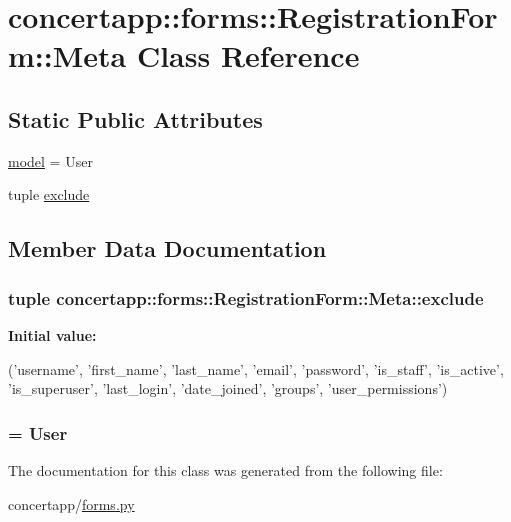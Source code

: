 \hypertarget{classconcertapp_1_1forms_1_1_registration_form_1_1_meta}{
\section{concertapp::forms::RegistrationForm::Meta Class Reference}
\label{classconcertapp_1_1forms_1_1_registration_form_1_1_meta}
}
\subsection*{Static Public Attributes}
\begin{DoxyCompactItemize}
\item 
\hyperlink{classconcertapp_1_1forms_1_1_registration_form_1_1_meta_a15c8c26f2419cc67f2c97a0758eafa81}{model} = User
\item 
tuple \hyperlink{classconcertapp_1_1forms_1_1_registration_form_1_1_meta_ac5577a8b7acb6f41ff788002f7cc0e44}{exclude}
\end{DoxyCompactItemize}


\subsection{Member Data Documentation}
\hypertarget{classconcertapp_1_1forms_1_1_registration_form_1_1_meta_ac5577a8b7acb6f41ff788002f7cc0e44}{
\subsubsection[{exclude}]{\setlength{\rightskip}{0pt plus 5cm}tuple {\bf concertapp::forms::RegistrationForm::Meta::exclude}}}
\label{classconcertapp_1_1forms_1_1_registration_form_1_1_meta_ac5577a8b7acb6f41ff788002f7cc0e44}
{\bfseries Initial value:}
\begin{DoxyCode}
('username', 'first_name', 'last_name', 'email', 'password',
             'is_staff', 'is_active', 'is_superuser', 'last_login', 
             'date_joined', 'groups', 'user_permissions')
\end{DoxyCode}
\hypertarget{classconcertapp_1_1forms_1_1_registration_form_1_1_meta_a15c8c26f2419cc67f2c97a0758eafa81}{
\subsubsection[{model}]{ = User}}
\label{classconcertapp_1_1forms_1_1_registration_form_1_1_meta_a15c8c26f2419cc67f2c97a0758eafa81}


The documentation for this class was generated from the following file:\begin{DoxyCompactItemize}
\item 
concertapp/\hyperlink{forms_8py}{forms.py}\end{DoxyCompactItemize}
